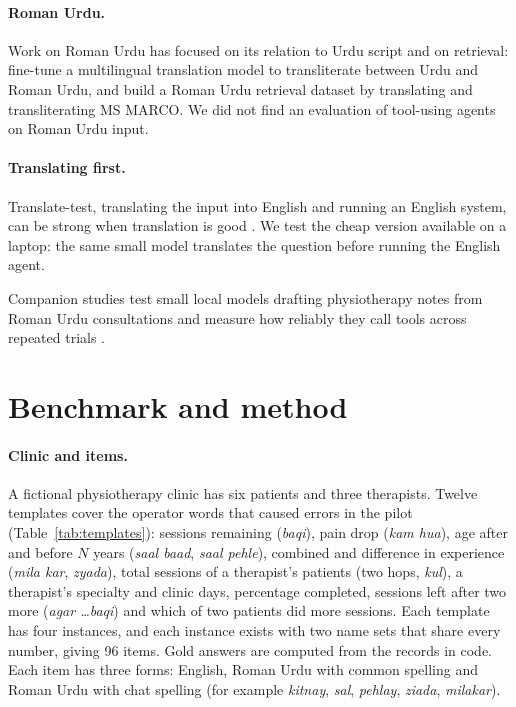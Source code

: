\documentclass[11pt]{article}
\begin{document}
\paragraph{Roman Urdu.} Work on Roman Urdu has focused on its relation to Urdu script and on retrieval: \citet{butt2025transliteration} fine-tune a multilingual translation model to transliterate between Urdu and Roman Urdu, and \citet{butt2025romanir} build a Roman Urdu retrieval dataset by translating and transliterating MS MARCO. We did not find an evaluation of tool-using agents on Roman Urdu input.

\paragraph{Translating first.} Translate-test, translating the input into English and running an English system, can be strong when translation is good \citep{artetxe2023revisiting}. We test the cheap version available on a laptop: the same small model translates the question before running the English agent.

Companion studies test small local models drafting physiotherapy notes from Roman Urdu consultations \citep{hussain2026soap} and measure how reliably they call tools across repeated trials \citep{hussain2026toolcall}.

\section{Benchmark and method}
\paragraph{Clinic and items.} A fictional physiotherapy clinic has six patients and three therapists. Twelve templates cover the operator words that caused errors in the pilot (Table~\ref{tab:templates}): sessions remaining (\emph{baqi}), pain drop (\emph{kam hua}), age after and before $N$ years (\emph{saal baad}, \emph{saal pehle}), combined and difference in experience (\emph{mila kar}, \emph{zyada}), total sessions of a therapist's patients (two hops, \emph{kul}), a therapist's specialty and clinic days, percentage completed, sessions left after two more (\emph{agar \dots baqi}) and which of two patients did more sessions. Each template has four instances, and each instance exists with two name sets that share every number, giving 96 items. Gold answers are computed from the records in code. Each item has three forms: English, Roman Urdu with common spelling and Roman Urdu with chat spelling (for example \emph{kitnay}, \emph{sal}, \emph{pehlay}, \emph{ziada}, \emph{milakar}).
\end{document}
